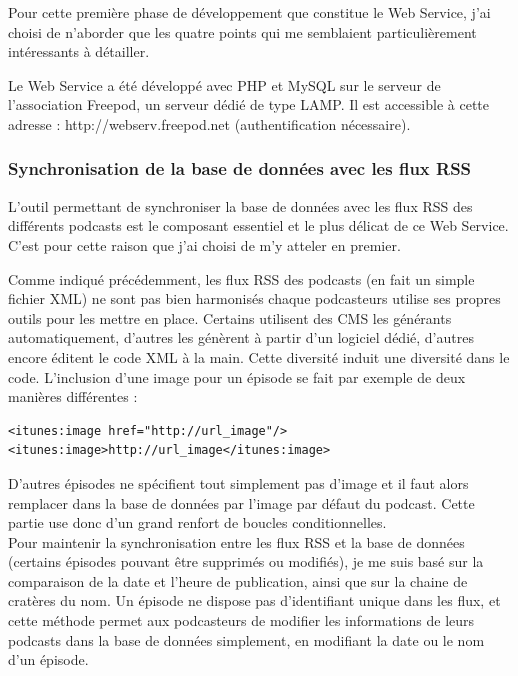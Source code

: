 \documentclass[11pt, french]{report}
\begin{document}
Pour cette première phase de développement que constitue le Web Service, j'ai choisi de n'aborder que les quatre points qui me semblaient particulièrement intéressants à détailler.

Le Web Service a été développé avec PHP et MySQL sur le serveur de l'association Freepod, un serveur dédié de type LAMP. Il est accessible à cette adresse : http://webserv.freepod.net (authentification nécessaire).

\subsubsection{Synchronisation de la base de données avec les flux RSS}

L'outil permettant de synchroniser la base de données avec les flux RSS des différents podcasts est le composant essentiel et le plus délicat de ce Web Service. C'est pour cette raison que j'ai choisi de m'y atteler en premier.\\


Comme indiqué précédemment, les flux RSS des podcasts (en fait un simple fichier XML) ne sont pas bien harmonisés chaque podcasteurs utilise ses propres outils pour les mettre en place. Certains utilisent des CMS les générants automatiquement, d'autres les génèrent à partir d'un logiciel dédié, d'autres encore éditent le code XML à la main. Cette diversité induit une diversité dans le code. L'inclusion d'une image pour un épisode se fait par exemple de deux manières différentes :
\begin{lstlisting}
<itunes:image href="http://url_image"/>
<itunes:image>http://url_image</itunes:image>
\end{lstlisting}
D'autres épisodes ne spécifient tout simplement pas d'image et il faut alors remplacer dans la base de données par l'image par défaut du podcast. Cette partie use donc d'un grand renfort de boucles conditionnelles.\\

Pour maintenir la synchronisation entre les flux RSS et la base de données (certains épisodes pouvant être supprimés ou modifiés), je me suis basé sur la comparaison de la date et l'heure de publication, ainsi que sur la chaine de cratères du nom. Un épisode ne dispose pas d'identifiant unique dans les flux, et cette méthode permet aux podcasteurs de modifier les informations de leurs podcasts dans la base de données simplement, en modifiant la date ou le nom d'un épisode.
\end{document}
